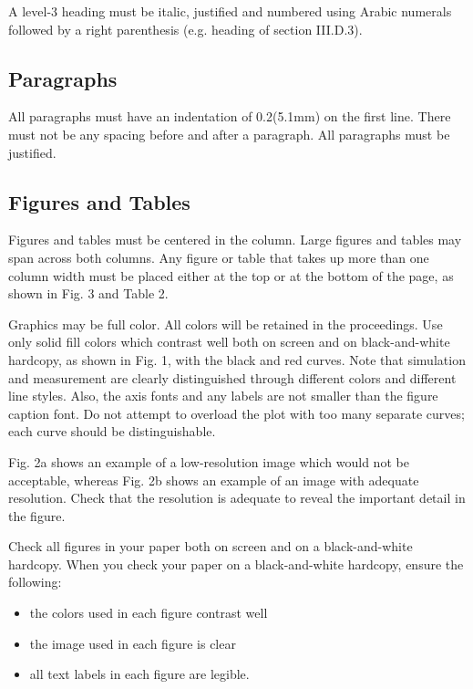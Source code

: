 \documentclass[conference,10pt,letterpaper]{IEEEtran}%
\begin{document}
A level-3 heading must be italic, justified and numbered using Arabic
numerals followed by a right parenthesis (e.g. heading of section
III.D.3).


\subsection{Paragraphs}

All paragraphs must have an indentation of 0.2\textquotedbl (5.1mm) on the first
line. There must not be any spacing before and after a paragraph. All
paragraphs must be justified.


\subsection{Figures and Tables}

Figures and tables must be centered in the column. Large figures and
tables may span across both columns. Any figure or table that takes up
more than one column width must be placed either at the top or at the
bottom of the page, as shown in Fig. 3 and Table 2.

Graphics may be full color. All colors will be retained in the
proceedings.  Use only solid fill colors which contrast well both on
screen and on black-and-white hardcopy, as shown in Fig. 1, with the
black and red curves. Note that simulation and measurement are clearly
distinguished through different colors and different line styles.
Also, the axis fonts and any labels are not smaller than the figure
caption font. Do not attempt to overload the plot with too many
separate curves; each curve should be distinguishable.

Fig. 2a shows an example of a low-resolution image which would not be
acceptable, whereas Fig. 2b shows an example of an image with adequate
resolution. Check that the resolution is adequate to reveal the
important detail in the figure.

Check all figures in your paper both on screen and on a
black-and-white hardcopy. When you check your paper on a
black-and-white hardcopy, ensure the following:
\begin{itemize}
\item the colors used in each figure contrast well
\item the image used in each figure is clear
\item all text labels in each figure are legible.
\end{itemize}
\end{document}
